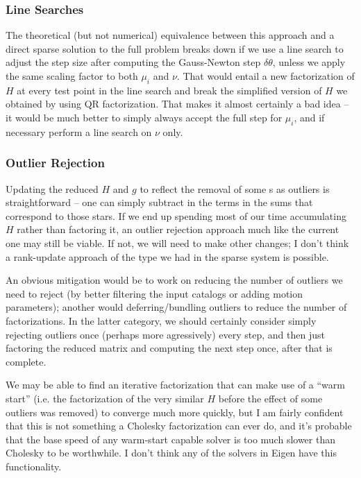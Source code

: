 \subsubsection{Line Searches}

The theoretical (but not numerical) equivalence between this approach and a direct sparse solution to the full problem breaks down if we use a line search to adjust the step size after computing the Gauss-Newton step $\delta\theta$, unless we apply the same scaling factor to both $\mu_i$ and $\nu$.
That would entail a new factorization of $H$ at every test point in the line search and break the simplified version of $H$ we obtained by using QR factorization.
That makes it almost certainly a bad idea -- it would be much better to simply always accept the full step for $\mu_i$, and if necessary perform a line search on $\nu$ only.

\subsubsection{Outlier Rejection}

Updating the reduced $H$ and $g$ to reflect the removal of some s as outliers is straightforward -- one can simply subtract in the terms in the sums that correspond to those stars.
If we end up spending most of our time accumulating $H$ rather than factoring it, an outlier rejection approach much like the current one may still be viable.
If not, we will need to make other changes; I don't think a rank-update approach of the type we had in the sparse system is possible.

An obvious mitigation would be to work on reducing the number of outliers we need to reject (by better filtering the input catalogs or adding motion parameters); another would deferring/bundling outliers to reduce the number of factorizations.
In the latter category, we should certainly consider simply rejecting outliers once (perhaps more agressively) every step, and then just factoring the reduced matrix and computing the next step once, after that is complete.

We may be able to find an iterative factorization that can make use of a ``warm start'' (i.e. the factorization of the very similar $H$ before the effect of some outliers was removed) to converge much more quickly, but I am fairly confident that this is not something a Cholesky factorization can ever do, and it's probable that the base speed of any warm-start capable solver is too much slower than Cholesky to be worthwhile.
I don't think any of the solvers in Eigen have this functionality.

